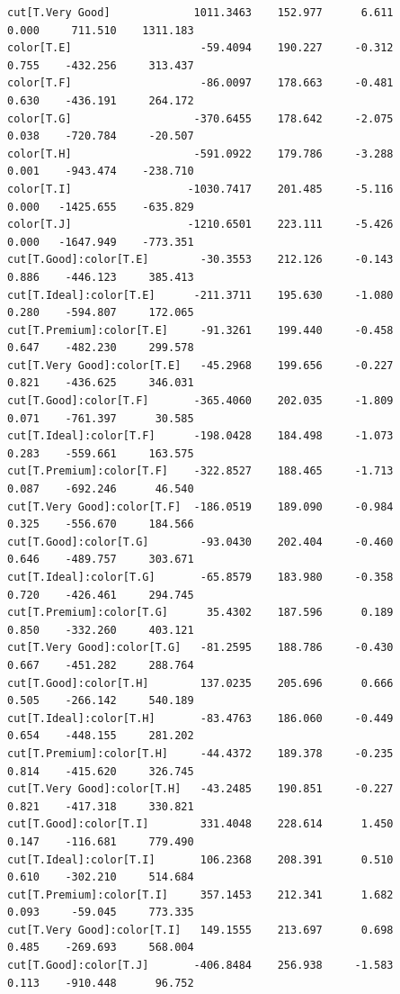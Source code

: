 \documentclass[
  letterpaper,
]{scrbook}
\begin{document}
\begin{verbatim}
cut[T.Very Good]             1011.3463    152.977      6.611      0.000     711.510    1311.183
color[T.E]                    -59.4094    190.227     -0.312      0.755    -432.256     313.437
color[T.F]                    -86.0097    178.663     -0.481      0.630    -436.191     264.172
color[T.G]                   -370.6455    178.642     -2.075      0.038    -720.784     -20.507
color[T.H]                   -591.0922    179.786     -3.288      0.001    -943.474    -238.710
color[T.I]                  -1030.7417    201.485     -5.116      0.000   -1425.655    -635.829
color[T.J]                  -1210.6501    223.111     -5.426      0.000   -1647.949    -773.351
cut[T.Good]:color[T.E]        -30.3553    212.126     -0.143      0.886    -446.123     385.413
cut[T.Ideal]:color[T.E]      -211.3711    195.630     -1.080      0.280    -594.807     172.065
cut[T.Premium]:color[T.E]     -91.3261    199.440     -0.458      0.647    -482.230     299.578
cut[T.Very Good]:color[T.E]   -45.2968    199.656     -0.227      0.821    -436.625     346.031
cut[T.Good]:color[T.F]       -365.4060    202.035     -1.809      0.071    -761.397      30.585
cut[T.Ideal]:color[T.F]      -198.0428    184.498     -1.073      0.283    -559.661     163.575
cut[T.Premium]:color[T.F]    -322.8527    188.465     -1.713      0.087    -692.246      46.540
cut[T.Very Good]:color[T.F]  -186.0519    189.090     -0.984      0.325    -556.670     184.566
cut[T.Good]:color[T.G]        -93.0430    202.404     -0.460      0.646    -489.757     303.671
cut[T.Ideal]:color[T.G]       -65.8579    183.980     -0.358      0.720    -426.461     294.745
cut[T.Premium]:color[T.G]      35.4302    187.596      0.189      0.850    -332.260     403.121
cut[T.Very Good]:color[T.G]   -81.2595    188.786     -0.430      0.667    -451.282     288.764
cut[T.Good]:color[T.H]        137.0235    205.696      0.666      0.505    -266.142     540.189
cut[T.Ideal]:color[T.H]       -83.4763    186.060     -0.449      0.654    -448.155     281.202
cut[T.Premium]:color[T.H]     -44.4372    189.378     -0.235      0.814    -415.620     326.745
cut[T.Very Good]:color[T.H]   -43.2485    190.851     -0.227      0.821    -417.318     330.821
cut[T.Good]:color[T.I]        331.4048    228.614      1.450      0.147    -116.681     779.490
cut[T.Ideal]:color[T.I]       106.2368    208.391      0.510      0.610    -302.210     514.684
cut[T.Premium]:color[T.I]     357.1453    212.341      1.682      0.093     -59.045     773.335
cut[T.Very Good]:color[T.I]   149.1555    213.697      0.698      0.485    -269.693     568.004
cut[T.Good]:color[T.J]       -406.8484    256.938     -1.583      0.113    -910.448      96.752

\end{verbatim}
\end{document}

